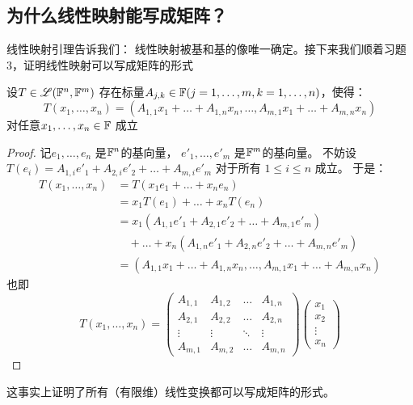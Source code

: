 \subsection{为什么线性映射能写成矩阵？}
线性映射引理告诉我们： 线性映射被基和基的像唯一确定。接下来我们顺着习题3，证明线性映射可以写成矩阵的形式
\begin{theorem}[线性映射的矩阵形式]
    设\(T \in \mathscr{L}(\mathbb{F}^{n},\mathbb{F}^{m})\)
    存在标量\(A_{j,k} \in
    \mathbb{F} (j = 1, \dots ,m, k=1, \dots, n) \)，使得：
    \[
        T(x_{1},\dots,x_{n})=(A_{1,1}x_{1}+\dots+A_{1,n}x_{n},\dots,A_{m,1}x_{1}+\dots+A_{m,n}x_{n})
    \]
    对任意\(x_{1},\dots,x_{n} \in \mathbb{F}\) 成立
\end{theorem}

\begin{proof}
    记\(e_{1}, \dots, e_{n}\) 是\(\mathbb{F}^{n}\)的基向量，
    \(e'_{1}, \dots, e'_{m}\)
    是\(\mathbb{F}^{m}\)的基向量。
    不妨设 \(T(e_{i}) = A_{1,i}e'_{1} +
        A_{2,i}e'_{2} + \dots +
    A_{m,i}e'_{m}\) 对于所有 \(1\leq i\leq n\) 成立。
    于是：
    \begin{align*}
        T(x_{1},\dots,x_{n}) &= T(x_{1}e_{1} + \dots +
        x_{n}e_{n})\\
        &= x_{1}T(e_{1}) + \dots + x_{n}T(e_{n})\\
        &= x_{1}(A_{1,1}e'_{1} + A_{2,1}e'_{2} +
        \dots + A_{m,1}e'_{m}) \nonumber \\
        &\quad + \dots +
        x_{n}(A_{1,n}e'_{1} + A_{2,n}e'_{2} +
        \dots + A_{m,n}e'_{m})\\    &=
        (A_{1,1}x_{1}+\dots+A_{1,n}x_{n},\dots,A_{m,1}x_{1}+\dots+A_{m,n}x_{n})
    \end{align*}
    也即\[
        T(x_1, \dots, x_n) =
        \begin{pmatrix}
            A_{1,1} & A_{1,2} & \dots & A_{1,n} \\
            A_{2,1} & A_{2,2} & \dots & A_{2,n} \\
            \vdots  & \vdots  & \ddots & \vdots  \\
            A_{m,1} & A_{m,2} & \dots & A_{m,n}
        \end{pmatrix}
        \begin{pmatrix}
            x_1 \\
            x_2 \\
            \vdots \\
            x_n
        \end{pmatrix}
    \]
\end{proof}
这事实上证明了所有（有限维）线性变换都可以写成矩阵的形式。

